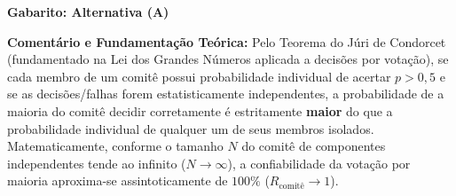 \documentclass[12pt,a4paper]{article}
\begin{document}
\textbf{Gabarito: Alternativa (A)}

\textbf{Comentário e Fundamentação Teórica:}
Pelo Teorema do Júri de Condorcet (fundamentado na Lei dos Grandes Números aplicada a decisões por votação), se cada membro de um comitê possui probabilidade individual de acertar $p > 0,5$ e se as decisões/falhas forem estatisticamente independentes, a probabilidade de a maioria do comitê decidir corretamente é estritamente \textbf{maior} do que a probabilidade individual de qualquer um de seus membros isolados. Matematicamente, conforme o tamanho $N$ do comitê de componentes independentes tende ao infinito ($N \to \infty$), a confiabilidade da votação por maioria aproxima-se assintoticamente de $100\%$ ($R_{\text{comitê}} \to 1$).
\end{document}
